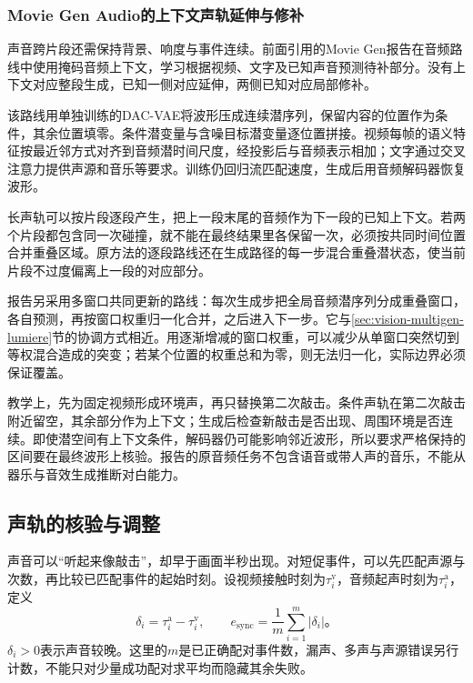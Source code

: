 \subsubsection{Movie Gen Audio的上下文声轨延伸与修补}
\label{sec:vision-multigen-movie-audio}

声音跨片段还需保持背景、响度与事件连续。前面引用的Movie Gen报告在音频路线中使用掩码音频上下文，学习根据视频、文字及已知声音预测待补部分。没有上下文对应整段生成，已知一侧对应延伸，两侧已知对应局部修补。

该路线用单独训练的DAC-VAE将波形压成连续潜序列，保留内容的位置作为条件，其余位置填零。条件潜变量与含噪目标潜变量逐位置拼接。视频每帧的语义特征按最近邻方式对齐到音频潜时间尺度，经投影后与音频表示相加；文字通过交叉注意力提供声源和音乐等要求。训练仍回归流匹配速度，生成后用音频解码器恢复波形。

长声轨可以按片段逐段产生，把上一段末尾的音频作为下一段的已知上下文。若两个片段都包含同一次碰撞，就不能在最终结果里各保留一次，必须按共同时间位置合并重叠区域。原方法的逐段路线还在生成路径的每一步混合重叠潜状态，使当前片段不过度偏离上一段的对应部分。

报告另采用多窗口共同更新的路线：每次生成步把全局音频潜序列分成重叠窗口，各自预测，再按窗口权重归一化合并，之后进入下一步。它与\ref{sec:vision-multigen-lumiere}节的协调方式相近。用逐渐增减的窗口权重，可以减少从单窗口突然切到等权混合造成的突变；若某个位置的权重总和为零，则无法归一化，实际边界必须保证覆盖。

教学上，先为固定视频形成环境声，再只替换第二次敲击。条件声轨在第二次敲击附近留空，其余部分作为上下文；生成后检查新敲击是否出现、周围环境是否连续。即使潜空间有上下文条件，解码器仍可能影响邻近波形，所以要求严格保持的区间要在最终波形上核验。报告的原音频任务不包含语音或带人声的音乐，不能从器乐与音效生成推断对白能力。

\subsection{声轨的核验与调整}
\label{sec:vision-multigen-audio-check}

声音可以“听起来像敲击”，却早于画面半秒出现。对短促事件，可以先匹配声源与次数，再比较已匹配事件的起始时刻。设视频接触时刻为$\tau_i^{\mathrm v}$，音频起声时刻为$\tau_i^{\mathrm a}$，定义
\begin{equation}
  \delta_i=\tau_i^{\mathrm a}-\tau_i^{\mathrm v},
  \qquad
  e_{\mathrm{sync}}=\frac1m\sum_{i=1}^{m}|\delta_i|\text{。}
  \label{eq:vision-event-sync-error}
\end{equation}
$\delta_i>0$表示声音较晚。这里的$m$是已正确配对事件数，漏声、多声与声源错误另行计数，不能只对少量成功配对求平均而隐藏其余失败。

